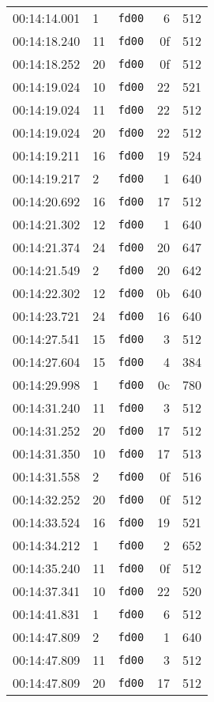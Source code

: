 \documentclass{article}
\begin{document}
\begin{longtable}{lllrr}
00:14:14.001 & 1 & \texttt{fd00} & 6 & 512 \\
00:14:18.240 & 11 & \texttt{fd00} & 0f & 512 \\
00:14:18.252 & 20 & \texttt{fd00} & 0f & 512 \\
00:14:19.024 & 10 & \texttt{fd00} & 22 & 521 \\
00:14:19.024 & 11 & \texttt{fd00} & 22 & 512 \\
00:14:19.024 & 20 & \texttt{fd00} & 22 & 512 \\
00:14:19.211 & 16 & \texttt{fd00} & 19 & 524 \\
00:14:19.217 & 2 & \texttt{fd00} & 1 & 640 \\
00:14:20.692 & 16 & \texttt{fd00} & 17 & 512 \\
00:14:21.302 & 12 & \texttt{fd00} & 1 & 640 \\
00:14:21.374 & 24 & \texttt{fd00} & 20 & 647 \\
00:14:21.549 & 2 & \texttt{fd00} & 20 & 642 \\
00:14:22.302 & 12 & \texttt{fd00} & 0b & 640 \\
00:14:23.721 & 24 & \texttt{fd00} & 16 & 640 \\
00:14:27.541 & 15 & \texttt{fd00} & 3 & 512 \\
00:14:27.604 & 15 & \texttt{fd00} & 4 & 384 \\
00:14:29.998 & 1 & \texttt{fd00} & 0c & 780 \\
00:14:31.240 & 11 & \texttt{fd00} & 3 & 512 \\
00:14:31.252 & 20 & \texttt{fd00} & 17 & 512 \\
00:14:31.350 & 10 & \texttt{fd00} & 17 & 513 \\
00:14:31.558 & 2 & \texttt{fd00} & 0f & 516 \\
00:14:32.252 & 20 & \texttt{fd00} & 0f & 512 \\
00:14:33.524 & 16 & \texttt{fd00} & 19 & 521 \\
00:14:34.212 & 1 & \texttt{fd00} & 2 & 652 \\
00:14:35.240 & 11 & \texttt{fd00} & 0f & 512 \\
00:14:37.341 & 10 & \texttt{fd00} & 22 & 520 \\
00:14:41.831 & 1 & \texttt{fd00} & 6 & 512 \\
00:14:47.809 & 2 & \texttt{fd00} & 1 & 640 \\
00:14:47.809 & 11 & \texttt{fd00} & 3 & 512 \\
00:14:47.809 & 20 & \texttt{fd00} & 17 & 512 \\

\end{longtable}
\end{document}
